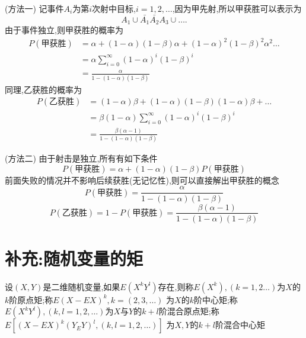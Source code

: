 \documentclass[12pt, a4paper, oneside, UTF8]{ctexbook}
\begin{document}
    \begin{solution}
        \item [(方法一)]
        记事件$A_i$为第$i$次射中目标,$i=1,2,\ldots$,因为甲先射,所以甲获胜可以表示为 
        \[
        A_1\cup\bar{A_1}\bar{A_2}A_3\cup\ldots.
        \]
        由于事件独立,则甲获胜的概率为
        \begin{align*}
        P(\text{甲获胜}) 
        &= \alpha + (1-\alpha)(1-\beta)\alpha + (1-\alpha)^2(1-\beta)^2\alpha^2\ldots \\ 
        &= \alpha \sum_{i=0}^{\infty}(1-\alpha)^{i}(1-\beta)^i \\
        &= \frac{\alpha}{1- (1-\alpha)(1-\beta)}
        \end{align*}
        同理,乙获胜的概率为
        \begin{align*}
        P(\text{乙获胜}) 
        &= (1-\alpha)\beta + (1-\alpha)(1-\beta)(1-\alpha)\beta+\ldots \\ 
        &= \beta(1-\alpha)\sum_{i=0}^{\infty}(1-\alpha)^i(1-\beta)^i \\
        &= \frac{\beta(\alpha-1)}{1- (1-\alpha)(1-\beta)}
        \end{align*}
        \item [(方法二)]
        由于射击是独立,所有有如下条件
        \[
        P(\text{甲获胜})=\alpha + (1-\alpha)(1-\beta)P(\text{甲获胜}) 
        \]
        前面失败的情况并不影响后续获胜(无记忆性),则可以直接解出甲获胜的概念
        \[
        P(\text{甲获胜})= \frac{\alpha}{1- (1-\alpha)(1-\beta)}
        \]
        \[
        P(\text{乙获胜}) = 1 - P(\text{甲获胜}) = \frac{\beta(\alpha-1)}{1- (1-\alpha)(1-\beta)}
        \]
    \end{solution}
\section{补充:随机变量的矩}
    设$(X,Y)$是二维随机变量,如果$E(X^kY^l)$存在,则称$E(X^k),(k=1,2\ldots)$为$X$的$k$阶原点矩;称$E(X-EX)^k,k=(2,3,\ldots)$
    为$X$的$k$阶中心矩;称$E(X^kY^l),(k,l=1,2,\ldots)$为$X$与$Y$的$k+l$阶混合原点矩;称$E[(X-EX)^k(Y_EY)^l,(k,l=1,2,\ldots)]$
    为$X,Y$的$k+l$阶混合中心矩 
\ifx\allfiles\undefined
\end{document}
